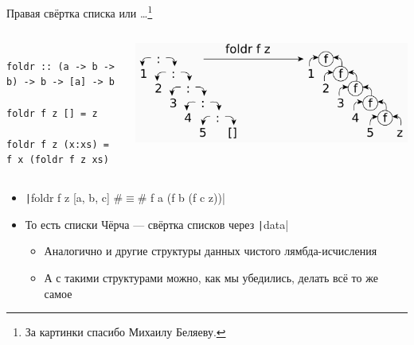     \begin{frame}[fragile]{Правая свёртка списка или \ldots\footnote{За картинки спасибо Михаилу Беляеву.}}
        \vspace{-1em}
        \begin{columns}[onlytextwidth]
            \begin{column}{0.485\textwidth}
                \begin{verbatim}
                    foldr :: (a -> b -> b) -> b -> [a] -> b
                    foldr f z [] = z
                    foldr f z (x:xs) = f x (foldr f z xs)
                \end{verbatim}
            \end{column}\hfill%
            \begin{column}{0.5\textwidth}
                \begin{center}
                    \includegraphics[width=1\textwidth]{figs/foldr}
                \end{center}
            \end{column}
        \end{columns}
        \begin{itemize}
            \item \texttt|foldr f z [a, b, c] #$\equiv$# f a (f b (f c z))|
            \item[\then] То есть списки Чёрча --- свёртка списков через \texttt|data|
            \begin{itemize}
                \item Аналогично и другие структуры данных чистого лямбда-исчисления
                \item А с такими структурами можно, как мы убедились, делать всё то же самое
            \end{itemize}
        \end{itemize}
    \end{frame}

